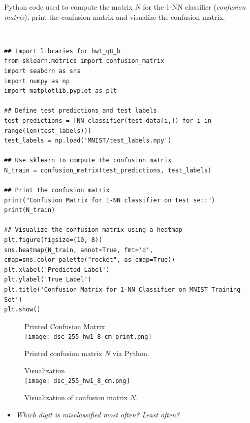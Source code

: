 \documentclass{article}
\begin{document}
\parbox{\textwidth}{Python code used to compute the matrix $N$ for the 1-NN classifier (\textit{confusion matrix}), print the confusion matrix and visualize the confusion matrix.}\\
\begin{center}

\begin{lstlisting}
## Import libraries for hw1_q8_b
from sklearn.metrics import confusion_matrix
import seaborn as sns
import numpy as np
import matplotlib.pyplot as plt

## Define test predictions and test labels
test_predictions = [NN_classifier(test_data[i,]) for i in range(len(test_labels))]
test_labels = np.load('MNIST/test_labels.npy')

## Use sklearn to compute the confusion matrix
N_train = confusion_matrix(test_predictions, test_labels)

## Print the confusion matrix
print("Confusion Matrix for 1-NN classifier on test set:")
print(N_train)

## Visualize the confusion matrix using a heatmap
plt.figure(figsize=(10, 8))
sns.heatmap(N_train, annot=True, fmt='d', cmap=sns.color_palette("rocket", as_cmap=True))
plt.xlabel('Predicted Label')
plt.ylabel('True Label')
plt.title('Confusion Matrix for 1-NN Classifier on MNIST Training Set')
plt.show()
\end{lstlisting}

\end{center}

\begin{figure}[htbp]
\centering
\begin{minipage}{0.48\textwidth} %
  \centering
  Printed Confusion Matrix \\
  \texttt{[image: dsc\_255\_hw1\_8\_cm\_print.png]}
  \caption{Printed confusion matrix $N$ via Python.}
  \label{fig:image_comparison_1}
\end{minipage}\hfill %
\begin{minipage}{0.48\textwidth} %
  \centering
  Visualization \\
  \texttt{[image: dsc\_255\_hw1\_8\_cm.png]}
  \caption{Visualization of confusion matrix $N$.}
  \label{fig:image_comparison_2}
\end{minipage}
\end{figure}

\begin{itemize}
    \item \textit{Which digit is misclassified most often? Least often?}
\end{itemize}
\end{document}
